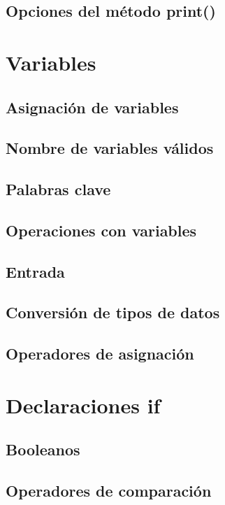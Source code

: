 \documentclass{article}
\begin{document}
\subsection{Opciones del método print()}

\newpage\section{Variables}

\subsection{Asignación de variables}

\subsection{Nombre de variables válidos}

\subsection{Palabras clave}

\subsection{Operaciones con variables}

\subsection{Entrada}

\subsection{Conversión de tipos de datos}

\subsection{Operadores de asignación}

\newpage\section{Declaraciones if}

\subsection{Booleanos}

\subsection{Operadores de comparación}
\end{document}
